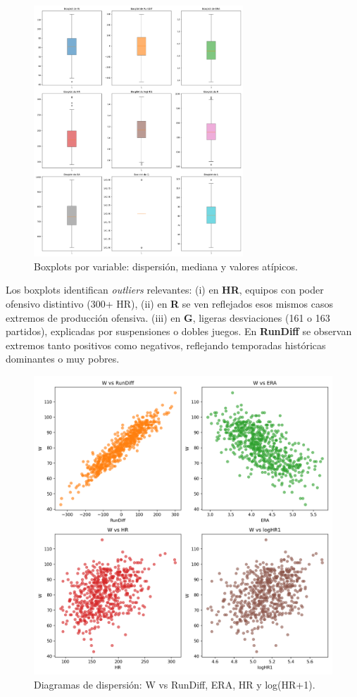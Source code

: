 \documentclass[10pt]{article}
\begin{document}
\begin{figure}[H]
    \centering
    \includegraphics[width=0.7\textwidth]{../plots/all_boxplots.png}
    \caption{Boxplots por variable: dispersión, mediana y valores atípicos.}
\end{figure}

Los boxplots identifican \textit{outliers} relevantes: 
(i) en \textbf{HR}, equipos con poder ofensivo distintivo (300+ HR), 
(ii) en \textbf{R} se ven reflejados esos mismos casos extremos de producción ofensiva.
(iii) en \textbf{G}, ligeras desviaciones (161 o 163 partidos), explicadas por suspensiones o dobles juegos. 
En \textbf{RunDiff} se observan extremos tanto positivos como negativos, reflejando temporadas históricas dominantes o muy pobres.

\begin{figure}[H]
    \centering
    \includegraphics[width=\textwidth]{../plots/all_scatter_W.png}
    \caption{Diagramas de dispersión: W vs RunDiff, ERA, HR y log(HR+1).}
\end{figure}
\end{document}
